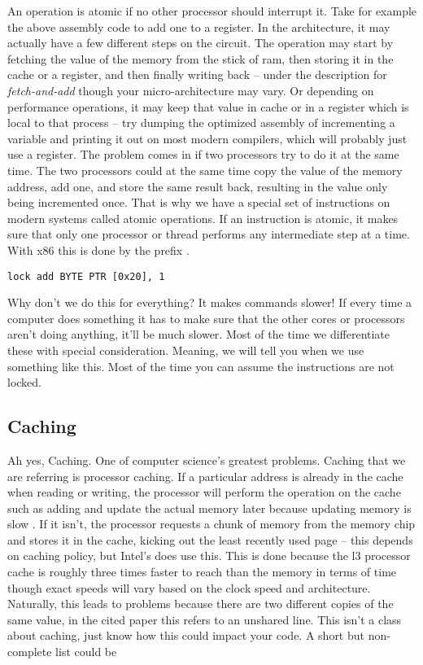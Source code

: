 An operation is atomic if no other processor should interrupt it. Take for example the above assembly code to add one to a register.
In the architecture, it may actually have a few different steps on the circuit.
The operation may start by fetching the value of the memory from the stick of ram, then storing it in the cache or a register, and then finally writing back \cite{schweizer2015evaluating} -- under the description for \textit{fetch-and-add} though your micro-architecture may vary.
Or depending on performance operations, it may keep that value in cache or in a register which is local to that process -- try dumping the  optimized assembly of incrementing a variable and printing it out on most modern compilers, which will probably just use a register.
The problem comes in if two processors try to do it at the same time.
The two processors could at the same time copy the value of the memory address, add one, and store the same result back, resulting in the value only being incremented once.
That is why we have a special set of instructions on modern systems called atomic operations.
If an instruction is atomic, it makes sure that only one processor or thread performs any intermediate step at a time.
With x86 this is done by the  prefix \cite[p. 1120]{guide2011intel}.

\begin{lstlisting}
lock add BYTE PTR [0x20], 1
\end{lstlisting}

Why don't we do this for everything?
It makes commands slower! If every time a computer does something it has to make sure that the other cores or processors aren't doing anything, it'll be much slower.
Most of the time we differentiate these with special consideration.
Meaning, we will tell you when we use something like this.
Most of the time you can assume the instructions are not locked.

\subsection{Caching}

Ah yes, Caching.
One of computer science's greatest problems.
Caching that we are referring is processor caching.
If a particular address is already in the cache when reading or writing, the processor will perform the operation on the cache such as adding and update the actual memory later because updating memory is slow \cite[Section 3.4]{intel2015improving}.
If it isn't, the processor requests a chunk of memory from the memory chip and stores it in the cache, kicking out the least recently used page -- this depends on caching policy, but Intel's does use this.
This is done because the l3 processor cache is roughly three times faster to reach than the memory in terms of time \cite[p. 22]{levinthal2009performance} though exact speeds will vary based on the clock speed and architecture.
Naturally, this leads to problems because there are two different copies of the same value, in the cited paper this refers to an unshared line.
This isn't a class about caching, just know how this could impact your code.
A short but non-complete list could be

